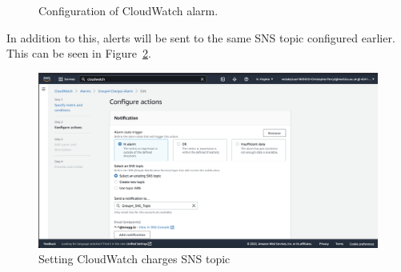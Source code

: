 \begin{figure}[!htbp]
    \centering
    \hfill
    \caption{Configuration of CloudWatch alarm.}
    \label{fig:cloudwatch-charges-config}
\end{figure}

\clearpage
In addition to this, alerts will be sent to the same SNS topic configured earlier.
This can be seen in Figure~\ref{fig:cloudwatch-charges-sns}.

\begin{figure}[!htbp]
    \centering
    \includegraphics[width=\textwidth]{resources/cloudwatch/cloudwatch-charges-sns}
    \caption{Setting CloudWatch charges SNS topic}
    \label{fig:cloudwatch-charges-sns}
\end{figure}

